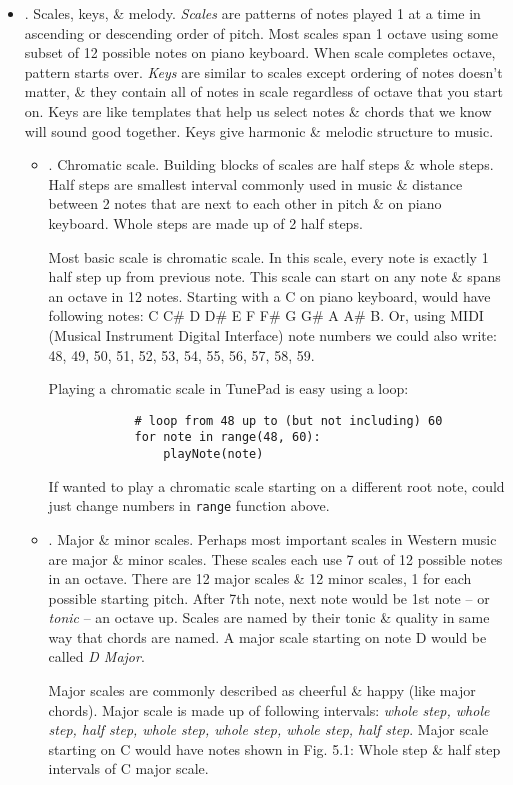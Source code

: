 \documentclass{article}
\begin{document}
\begin{itemize}
\begin{itemize}
	\end{itemize}
	\item {. Scales, keys, \& melody.} {\it Scales} are patterns of notes played 1 at a time in ascending or descending order of pitch. Most scales span 1 octave using some subset of 12 possible notes on piano keyboard. When scale completes octave, pattern starts over. {\it Keys} are similar to scales except ordering of notes doesn't matter, \& they contain all of notes in scale regardless of octave that you start on. Keys are like templates that help us select notes \& chords that we know will sound good together. Keys give harmonic \& melodic structure to music.
	\begin{itemize}
		\item {. Chromatic scale.} Building blocks of scales are half steps \& whole steps. Half steps are smallest interval commonly used in music \& distance between 2 notes that are next to each other in pitch \& on piano keyboard. Whole steps are made up of 2 half steps.
		
		Most basic scale is chromatic scale. In this scale, every note is exactly 1 half step up from previous note. This scale can start on any note \& spans an octave in 12 notes. Starting with a C on piano keyboard, would have following notes: C C\# D D\# E F F\# G G\# A A\# B. Or, using MIDI (Musical Instrument Digital Interface) note numbers we could also write: 48, 49, 50, 51, 52, 53, 54, 55, 56, 57, 58, 59.
		
		Playing a chromatic scale in TunePad is easy using a loop:
		\begin{verbatim}
			# loop from 48 up to (but not including) 60
			for note in range(48, 60):
			    playNote(note)
		\end{verbatim}
		If wanted to play a chromatic scale starting on a different root note, could just change numbers in {\tt range} function above.
		\item {. Major \& minor scales.} Perhaps most important scales in Western music are major \& minor scales. These scales each use 7 out of 12 possible notes in an octave. There are 12 major scales \& 12 minor scales, 1 for each possible starting pitch. After 7th note, next note would be 1st note -- or {\it tonic} -- an octave up. Scales are named by their tonic \& quality in same way that chords are named. A major scale starting on note D would be called {\it D Major}.
		
		Major scales are commonly described as cheerful \& happy (like major chords). Major scale is made up of following intervals: {\it whole step, whole step, half step, whole step, whole step, whole step, half step}. Major scale starting on C would have notes shown in {\sf Fig. 5.1: Whole step \& half step intervals of C major scale.}
		

\end{itemize}
\end{itemize}
\end{document}
